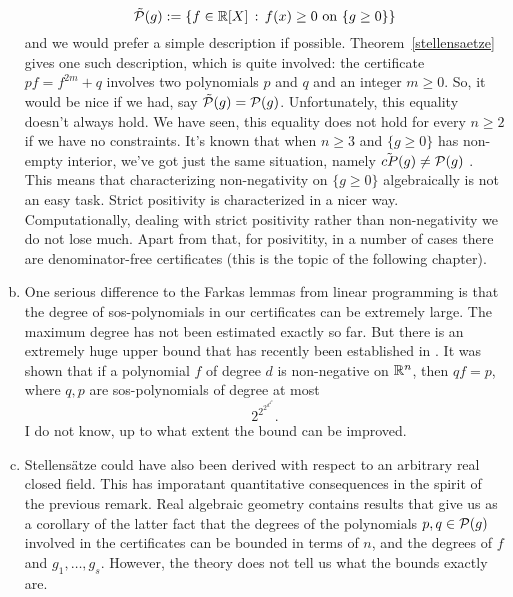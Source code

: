 \begin{enumerate}[(a)]
		\[
		\Tilde{\mathcal{P}}(g):=\left\{ f \in \mathbb{R}[X] \,:\, f(x) \ge 0 \ \text{on} \ \{g \ge 0\} \right\}
		\] 
		and we would prefer a simple description if possible. Theorem~\ref{stellensaetze} gives one such description, which is quite involved: the certificate $p f = f^{2m} + q$ involves two polynomials $p$ and $q$ and an integer $m \ge 0$. So, it would be nice if we had, say $\Tilde{\mathcal{P}}(g)=\mathcal{P}(g)$. Unfortunately, this equality doesn't always hold. We have seen, this equality does not hold for every $n \ge 2$  if we have no constraints. It's known that when $n \ge 3$ and $\{g \ge 0\}$ has non-empty interior, we've got just the same situation, namely $\Tilde{cP}(g) \ne \mathcal{P}(g)$ . This means that characterizing non-negativity on $\{g \ge 0\}$ algebraically is not an easy task. Strict positivity is characterized in a nicer way. Computationally, dealing with strict positivity rather than non-negativity we do not lose much. Apart from that, for posivitity, in a number of cases there are denominator-free certificates (this is the topic of the following chapter).
		\item One serious difference to the Farkas lemmas from linear programming is that the degree of sos-polynomials in our certificates can be extremely large. The maximum degree has not been estimated exactly so far. But there is an extremely huge upper bound that has recently been established in \cite{lombardi2014elementary}. It was shown that if a polynomial $f$ of degree $d$ is non-negative on $\mathbb{R}^n$, then $q f = p$, where $q,p$ are sos-polynomials of degree at most 
		\[
			2^{2^{2^{d^{4^n}}}}.
		\]
		I do not know, up to what extent the bound can be improved. 
		\item Stellensätze could have also been derived with respect to an arbitrary real closed field. This has imporatant quantitative consequences in the spirit of the previous remark. Real algebraic geometry contains results that give us as a corollary of the latter fact that the degrees of the polynomials $p,q \in \mathcal{P}(g)$ involved in the certificates can be bounded in terms of $n$, and the degrees of $f$ and $g_1,\ldots,g_s$. However, the theory does not tell us what the bounds exactly are. 
	\end{enumerate}


